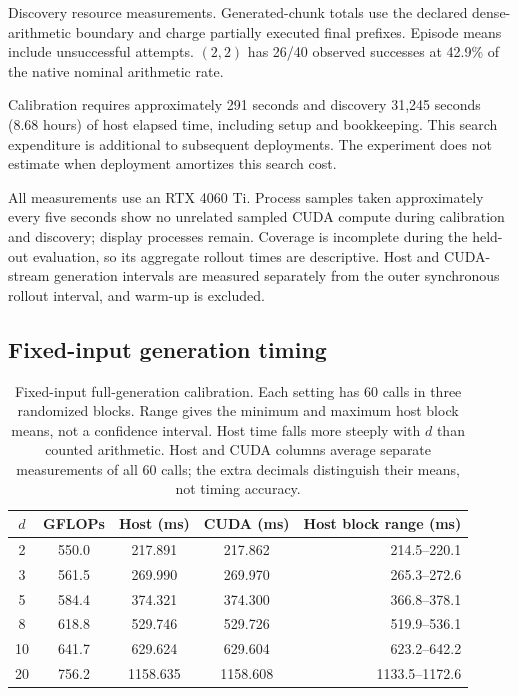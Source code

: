 \documentclass{article}
\begin{document}
\begin{table}[htbp]
\centering\small
\caption{Discovery resource measurements. Generated-chunk totals use the declared
dense-arithmetic boundary and charge partially executed final prefixes.
Episode means include unsuccessful attempts. $(2,2)$ has 26/40 observed
successes at 42.9\% of the native nominal arithmetic rate.}
\label{tab:resources}

\end{table}

Calibration requires approximately 291 seconds and discovery 31,245 seconds
(8.68 hours) of host elapsed time, including setup and bookkeeping. This search
expenditure is additional to subsequent deployments. The experiment does not
estimate when deployment amortizes this search cost.

All measurements use an RTX 4060 Ti. Process samples taken approximately every
five seconds show no unrelated sampled CUDA compute during calibration and
discovery; display processes remain. Coverage is incomplete during the held-out
evaluation, so its aggregate rollout times are descriptive. Host and CUDA-stream
generation intervals are measured separately from the outer synchronous rollout
interval, and warm-up is excluded.

\subsection{Fixed-input generation timing}
\label{app:fixed-timing}

\begin{table}[htbp]
\centering\small
\caption{Fixed-input full-generation calibration. Each setting has 60 calls in
three randomized blocks. Range gives the minimum and maximum host block means,
not a confidence interval. Host time falls more steeply with $d$ than counted
arithmetic. Host and CUDA columns average separate measurements of all 60 calls; the extra decimals distinguish their means, not timing accuracy.}
\begin{tabular}{@{}cS[table-format=3.1]S[table-format=4.3]S[table-format=4.3]r@{}}
\toprule
$d$ & {GFLOPs} & {Host (ms)} & {CUDA (ms)} & Host block range (ms)\\
 & 550.0 & 217.891 & 217.862 & 214.5--220.1\\
3 & 561.5 & 269.990 & 269.970 & 265.3--272.6\\
5 & 584.4 & 374.321 & 374.300 & 366.8--378.1\\
8 & 618.8 & 529.746 & 529.726 & 519.9--536.1\\
10 & 641.7 & 629.624 & 629.604 & 623.2--642.2\\
20 & 756.2 & 1158.635 & 1158.608 & 1133.5--1172.6\\
\bottomrule
\end{tabular}
\end{table}
\end{document}
